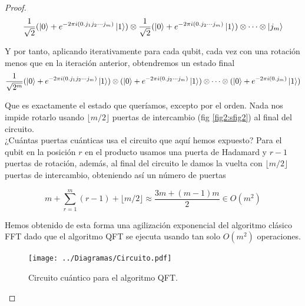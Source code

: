\documentclass[11pt, spanish]{report}
\numberwithin{equation}{section}
\numberwithin{defin}{section}
\begin{document}
\begin{proof}
\begin{equation}
\frac{1}{\sqrt{2}}(\ket{0}+e^{-2\pi i(0.j_1j_2\cdots j_m)}\ket{1})\otimes\frac{1}{\sqrt{2}}(\ket{0}+e^{-2\pi i(0.j_2\cdots j_m)}\ket{1})\otimes\cdots\otimes\ket{j_m}
\end{equation}

Y por tanto, aplicando iterativamente para cada qubit, cada vez con una rotación menos que en la iteración anterior, obtendremos un estado final
\begin{equation}
\frac{1}{\sqrt{2^m}}(\ket{0}+e^{-2\pi i(0.j_1j_2\cdots j_m)}\ket{1})\otimes(\ket{0}+e^{-2\pi i(0.j_2\cdots j_m)}\ket{1})\otimes\cdots\otimes(\ket{0}+e^{-2\pi i(0.j_m)}\ket{1})
\end{equation}

Que es exactamente el estado que queríamos, excepto por el orden. Nada nos impide rotarlo usando $\lfloor m/2 \rfloor$ puertas de intercambio (fig \ref{fig2:sfig2}) al final del circuito.\\

¿Cuántas puertas cuánticas usa el circuito que aquí hemos expuesto? Para el qubit en la posición $r$ en el producto usamos una puerta de Hadamard y $r-1$ puertas de rotación, además, al final del circuito le damos la vuelta con $\lfloor m/2 \rfloor$ puertas de intercambio, obteniendo así un número de puertas

\begin{equation}
m+\sum_{r=1}^m (r-1)+\lfloor m/2 \rfloor \approx \frac{3m+(m-1)m}{2}\in O(m^2)
\end{equation}

Hemos obtenido de esta forma una agilización exponencial del algoritmo clásico FFT dado que el algoritmo QFT se ejecuta usando tan solo $O(m^2)$ operaciones.

\begin{figure}[]
  \centering
  \texttt{[image: ../Diagramas/Circuito.pdf]}
  \caption{Circuito cuántico para el algoritmo QFT.}
\end{figure}
\end{proof}
\end{document}
